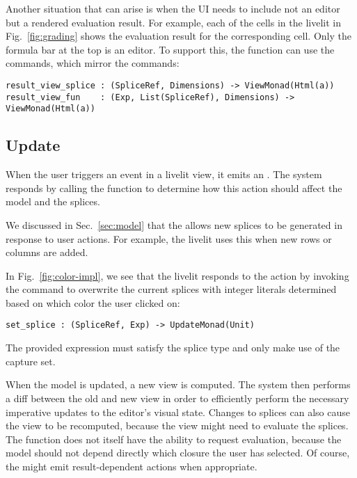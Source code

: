 Another situation that can arise is when the UI needs to include not an editor but 
a rendered evaluation result. For example, each of the cells in the 
livelit in Fig.~\ref{fig:grading} shows the evaluation result for the corresponding 
cell. Only the formula bar at the top is an editor. To support this, the 
function can use the  commands, which mirror the  commands:
\begin{lstlisting}[numbers=none]
result_view_splice : (SpliceRef, Dimensions) -> ViewMonad(Html(a))
result_view_fun    : (Exp, List(SpliceRef), Dimensions) -> ViewMonad(Html(a))
\end{lstlisting}


\subsection{Update}
When the user triggers an event in a livelit view, it emits an .
The system responds by calling the  function to determine how 
this action should affect the model and the splices. 

We discussed in Sec.~\ref{sec:model} that the 
allows new splices to be generated in response to user actions. 
For example, the  livelit uses this when new rows
or columns are added.

In Fig.~\ref{fig:color-impl}, we see that the  livelit responds to 
the  action by invoking the  command to overwrite 
the current splices with integer literals determined based on which color the user
clicked on:
\begin{lstlisting}[numbers=none]
  set_splice : (SpliceRef, Exp) -> UpdateMonad(Unit)
\end{lstlisting}
The provided expression must satisfy the splice type and only make use of the capture set.

When the model is updated, a new view is 
computed. The system then performs a diff between the old and new view in order to 
efficiently perform the necessary imperative updates to the editor's visual state.
Changes to splices can also cause the view to be recomputed, because the view might 
need to evaluate the splices. The  function does not itself 
have the ability to request evaluation, because the model should not depend directly  
which closure the user has selected. Of course, the  might emit 
result-dependent actions when appropriate.

